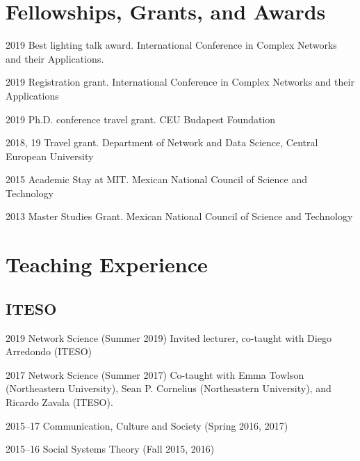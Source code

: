 \documentclass{academiccv}
\begin{document}
\section*{Fellowships, Grants, and Awards}

\begin{tablist}
\item [2019] \tab Best lighting talk award. International Conference in Complex Networks and their Applications.

\item[2019] \tab Registration grant. International Conference in Complex Networks and their Applications

\item[2019] \tab Ph.D. conference travel grant. CEU Budapest Foundation

\item[2018, 19] \tab Travel grant. Department of Network and Data Science, Central European University

\item[2015] \tab Academic Stay at MIT. Mexican National Council of Science and Technology

\item[2013] \tab Master Studies Grant. Mexican National Council of Science and Technology

\end{tablist}



\section*{Teaching Experience}

\subsection*{ITESO}

\begin{tablist}
	\item[2019] \tab Network Science (Summer 2019) Invited lecturer, co-taught with Diego Arredondo (ITESO)

	\item[2017]	\tab Network Science (Summer 2017) Co-taught with Emma Towlson (Northeastern University), Sean P. Cornelius (Northeastern University), and Ricardo Zavala (ITESO).

	\item [2015--17]\tab Communication, Culture and Society (Spring 2016, 2017)

	\item [2015--16]\tab Social Systems Theory (Fall 2015, 2016)


\end{tablist} 
\end{document}
